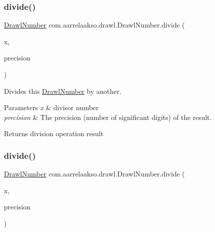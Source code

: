\subsubsection{\texorpdfstring{divide()}{divide()}\hspace{0.1cm}{\footnotesize\ttfamily [2/3]}}
{\footnotesize\ttfamily \hyperlink{classcom_1_1aarrelaakso_1_1drawl_1_1_drawl_number}{Drawl\+Number} com.\+aarrelaakso.\+drawl.\+Drawl\+Number.\+divide (\begin{DoxyParamCaption}\item[{@Not\+Null \hyperlink{classcom_1_1aarrelaakso_1_1drawl_1_1_drawl_number}{Drawl\+Number}}]{x,  }\item[{int}]{precision }\end{DoxyParamCaption})\hspace{0.3cm}{\ttfamily [protected]}}



Divides this \hyperlink{classcom_1_1aarrelaakso_1_1drawl_1_1_drawl_number}{Drawl\+Number} by another. 


\begin{DoxyParams}{Parameters}
{\em x} & divisor number \\
\hline
{\em precision} & The precision (number of significant digits) of the result. \\
\hline
\end{DoxyParams}
\begin{DoxyReturn}{Returns}
division operation result 
\end{DoxyReturn}
\mbox{\label{classcom_1_1aarrelaakso_1_1drawl_1_1_drawl_number_aaefd2f03c90250ae78a0baaea1c468d4}} 
\subsubsection{\texorpdfstring{divide()}{divide()}\hspace{0.1cm}{\footnotesize\ttfamily [3/3]}}
{\footnotesize\ttfamily \hyperlink{classcom_1_1aarrelaakso_1_1drawl_1_1_drawl_number}{Drawl\+Number} com.\+aarrelaakso.\+drawl.\+Drawl\+Number.\+divide (\begin{DoxyParamCaption}\item[{double}]{x,  }\item[{int}]{precision }\end{DoxyParamCaption})\hspace{0.3cm}{\ttfamily [protected]}}



